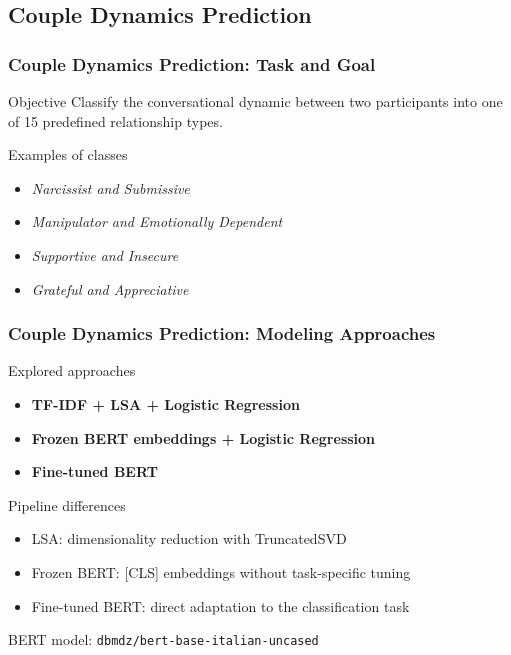 \documentclass[aspectratio=169,xcolor=dvipsnames]{beamer}
\begin{document}
\subsection{Couple Dynamics Prediction}

\begin{frame}
\frametitle{Couple Dynamics Prediction: Task and Goal}

\begin{block}{Objective}
Classify the conversational dynamic between two participants into one of 15 predefined relationship types.
\end{block}

\begin{block}{Examples of classes}
\begin{itemize}
\item \textit{Narcissist and Submissive}
\item \textit{Manipulator and Emotionally Dependent}
\item \textit{Supportive and Insecure}
\item \textit{Grateful and Appreciative}
\end{itemize}
\end{block}

\end{frame}

\begin{frame}
\frametitle{Couple Dynamics Prediction: Modeling Approaches}

\begin{block}{Explored approaches}
\begin{itemize}
\item \textbf{TF-IDF + LSA + Logistic Regression}
\item \textbf{Frozen BERT embeddings + Logistic Regression}
\item \textbf{Fine-tuned BERT}
\end{itemize}
\end{block}

\begin{block}{Pipeline differences}
\begin{itemize}
\item LSA: dimensionality reduction with TruncatedSVD
\item Frozen BERT: [CLS] embeddings without task-specific tuning
\item Fine-tuned BERT: direct adaptation to the classification task
\end{itemize}
\end{block}

\vspace{0.3cm}
\begin{center}
\colorbox{blue!10}{\parbox{0.8\linewidth}{\centering BERT model: \texttt{dbmdz/bert-base-italian-uncased}}}
\end{center}

\end{frame}
\end{document}
